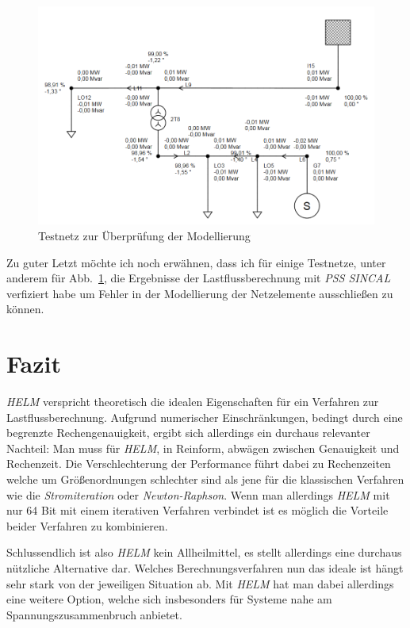 \documentclass[12pt,a4paper]{article}
\newcommand{\reffig}[1]{{Abb.~\ref{fig:#1}}}
\begin{document}
	\begin{figure}
		\centering
		\includegraphics[scale=0.55]{pictures/complete_powernet_modified}
		\caption{Testnetz zur Überprüfung der Modellierung}
		\label{fig:powernet_complete}
	\end{figure}
	
	Zu guter Letzt möchte ich noch erwähnen, dass ich für einige Testnetze, unter anderem für \reffig{powernet_complete}, die Ergebnisse der Lastflussberechnung mit \emph{PSS SINCAL} verfiziert habe um Fehler in der Modellierung der Netzelemente ausschließen zu können.
	
	\section{Fazit}
	\emph{HELM} verspricht theoretisch die idealen Eigenschaften für ein Verfahren zur Lastflussberechnung. Aufgrund numerischer Einschränkungen, bedingt durch eine begrenzte Rechengenauigkeit, ergibt sich allerdings ein durchaus relevanter Nachteil: Man muss für \emph{HELM}, in Reinform, abwägen zwischen Genauigkeit und Rechenzeit. Die Verschlechterung der Performance führt dabei zu Rechenzeiten welche um Größenordnungen schlechter sind als jene für die klassischen Verfahren wie die \emph{Stromiteration} oder \emph{Newton-Raphson}. Wenn man allerdings \emph{HELM} mit nur 64 Bit mit einem iterativen Verfahren verbindet ist es möglich die Vorteile beider Verfahren zu kombinieren.
	
	Schlussendlich ist also \emph{HELM} kein Allheilmittel, es stellt allerdings eine durchaus nützliche Alternative dar. Welches Berechnungsverfahren nun das ideale ist hängt sehr stark von der jeweiligen Situation ab. Mit \emph{HELM} hat man dabei allerdings eine weitere Option, welche sich insbesonders für Systeme nahe am Spannungszusammenbruch anbietet.
	
\end{document}
